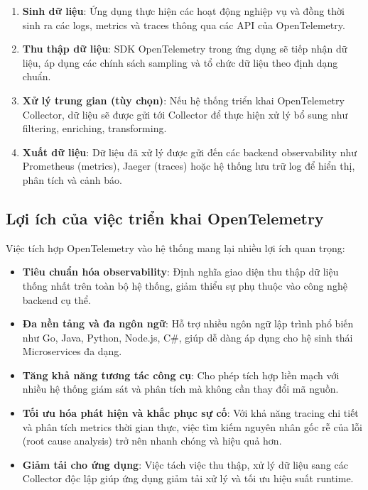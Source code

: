 \documentclass{uetgraduation}
\begin{document}
\begin{enumerate}
    \item \textbf{Sinh dữ liệu}: Ứng dụng thực hiện các hoạt động nghiệp vụ và đồng thời sinh ra các logs, metrics và traces thông qua các API của OpenTelemetry.
    
    \item \textbf{Thu thập dữ liệu}: SDK OpenTelemetry trong ứng dụng sẽ tiếp nhận dữ liệu, áp dụng các chính sách sampling và tổ chức dữ liệu theo định dạng chuẩn.
    
    \item \textbf{Xử lý trung gian (tùy chọn)}: Nếu hệ thống triển khai OpenTelemetry Collector, dữ liệu sẽ được gửi tới Collector để thực hiện xử lý bổ sung như filtering, enriching, transforming.
    
    \item \textbf{Xuất dữ liệu}: Dữ liệu đã xử lý được gửi đến các backend observability như Prometheus (metrics), Jaeger (traces) hoặc hệ thống lưu trữ log để hiển thị, phân tích và cảnh báo.
\end{enumerate}

\subsection{Lợi ích của việc triển khai OpenTelemetry}

Việc tích hợp OpenTelemetry vào hệ thống mang lại nhiều lợi ích quan trọng:

\begin{itemize}
    \item \textbf{Tiêu chuẩn hóa observability}: Định nghĩa giao diện thu thập dữ liệu thống nhất trên toàn bộ hệ thống, giảm thiểu sự phụ thuộc vào công nghệ backend cụ thể.
    
    \item \textbf{Đa nền tảng và đa ngôn ngữ}: Hỗ trợ nhiều ngôn ngữ lập trình phổ biến như Go, Java, Python, Node.js, C\#, giúp dễ dàng áp dụng cho hệ sinh thái Microservices đa dạng.
    
    \item \textbf{Tăng khả năng tương tác công cụ}: Cho phép tích hợp liền mạch với nhiều hệ thống giám sát và phân tích mà không cần thay đổi mã nguồn.
    
    \item \textbf{Tối ưu hóa phát hiện và khắc phục sự cố}: Với khả năng tracing chi tiết và phân tích metrics thời gian thực, việc tìm kiếm nguyên nhân gốc rễ của lỗi (root cause analysis) trở nên nhanh chóng và hiệu quả hơn.
    
    \item \textbf{Giảm tải cho ứng dụng}: Việc tách việc thu thập, xử lý dữ liệu sang các Collector độc lập giúp ứng dụng giảm tải xử lý và tối ưu hiệu suất runtime.
\end{itemize}
\end{document}
